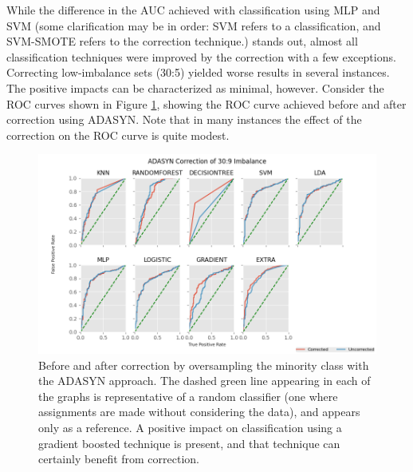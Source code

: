 \documentclass[letterpaper]{report}
\begin{document}
While the difference in the AUC achieved with classification using MLP and SVM (some clarification may be in order: SVM refers to a classification, and SVM-SMOTE refers to the correction technique.) stands out, almost all classification techniques were improved by the correction with a few exceptions. Correcting low-imbalance sets (30:5) yielded worse results in several instances. The positive impacts can be characterized as minimal, however. Consider the ROC curves shown in Figure \ref{fig:auc}, showing the ROC curve achieved before and after correction using ADASYN. Note that in many instances the effect of the correction on the ROC curve is quite modest.

\begin{figure}[h]
	\centering
	\includegraphics[height=0.35\textheight]{figures/roc-corrected.png}
	\caption[Before and after correction]{Before and after correction by oversampling the minority class with the ADASYN approach. The dashed green line appearing in each of the graphs is representative of a random classifier (one where assignments are made without considering the data), and appears only as a reference. A positive impact on classification using a gradient boosted technique is present, and that technique can certainly benefit from correction. }
	\label{fig:auc}
\end{figure}
\end{document}
